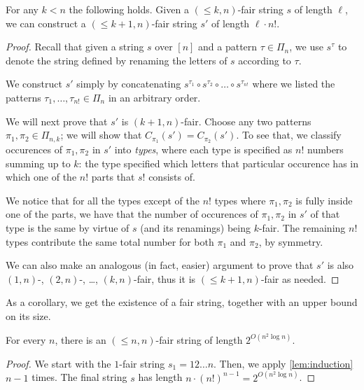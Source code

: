 \documentclass{article}
\begin{document}
\begin{lemma}
\label{lem:induction}
For any $k<n$ the following holds. Given a $(\le k, n)$-fair string $s$ of length $\ell$, we can construct a $(\le k+1, n)$-fair string $s'$ of length $\ell \cdot n!$. 
\end{lemma}
\begin{proof}
Recall that given a string $s$ over $[n]$ and a pattern $\tau \in \Pi_n$, we use $s^\tau$ to denote the string defined by renaming the letters of $s$ according to $\tau$. 

We construct $s'$ simply by concatenating $s^{\tau_1} \circ s^{\tau_2} \circ \dots \circ s^{\tau_{n!}}$ where we listed the patterns $\tau_1, \dots, \tau_{n!} \in \Pi_n$ in an arbitrary order. 

We will next prove that $s'$ is $(k+1, n)$-fair. Choose any two patterns $\pi_1, \pi_2 \in \Pi_{n,k}$; we will show that $C_{\pi_1}(s') = C_{\pi_2}(s')$. 
To see that, we classify occurences of $\pi_1, \pi_2$ in $s'$ into \emph{types}, where each type is specified as $n!$ numbers summing up to $k$: the type specified which letters that particular occurence has in which one of the $n!$ parts that $s!$ consists of. 

We notice that for all the types except of the $n!$ types where $\pi_1, \pi_2$ is fully inside one of the parts, we have that the number of occurences of $\pi_1, \pi_2$ in $s'$ of that type is the same by virtue of $s$ (and its renamings) being $k$-fair. The remaining $n!$ types contribute the same total number for both $\pi_1$ and $\pi_2$, by symmetry. 

We can also make an analogous (in fact, easier) argument to prove that $s'$ is also $(1,n)$-, $(2,n)$-, \dots, $(k,n)$-fair, thus it is $(\le k+1,n)$-fair as needed. 
\end{proof}

As a corollary, we get the existence of a fair string, together with an upper bound on its size. 

\begin{corollary}
\label{cor:bound}
    For every $n$, there is an $(\le n, n)$-fair string of length $2^{O(n^2 \log n)}$.  
\end{corollary}
\begin{proof}
We start with the $1$-fair string $s_1 = 12 \dots n$. Then, we apply \cref{lem:induction} $n-1$ times. The final string $s$ has length $n \cdot (n!)^{n-1} = 2^{O(n^2 \log n)}$. 
\end{proof}
\end{document}
